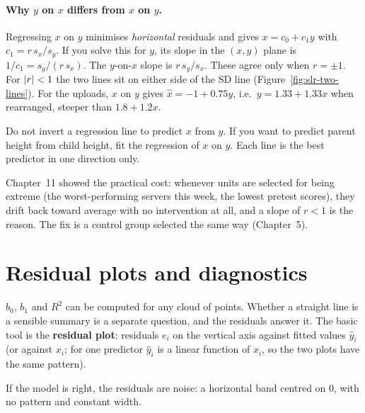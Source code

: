 \paragraph{Why $y$ on $x$ differs from $x$ on $y$.}
Regressing $x$ on $y$ minimises \emph{horizontal} residuals and gives
$x = c_0 + c_1 y$ with $c_1 = r\,s_x/s_y$. If you solve this for $y$, its slope
in the $(x,y)$ plane is $1/c_1 = s_y/(r\,s_x)$. The $y$-on-$x$ slope is
$r\,s_y/s_x$. These agree only when $r=\pm1$. For $\lvert r\rvert<1$ the two lines
sit on either side of the SD line (Figure~\ref{fig:slr-two-lines}). For the
uploads, $x$ on $y$ gives $\hat x = -1 + 0.75y$, i.e.\ $y = 1.33 + 1.33x$ when
rearranged, steeper than $1.8+1.2x$.

\begin{trapbox}
Do not invert a regression line to predict $x$ from $y$. If you want to predict
parent height from child height, fit the regression of $x$ on $y$. Each line is
the best predictor in one direction only.
\end{trapbox}

\begin{happeningbox}
Chapter~11 showed the practical cost: whenever units are selected for being
extreme (the worst-performing servers this week, the lowest pretest scores),
they drift back toward average with no intervention at all, and a slope of
$r<1$ is the reason. The fix is a control group selected the same way
(Chapter~5).
\end{happeningbox}

\section{Residual plots and diagnostics}
\label{sec:slr-diag}

$b_0$, $b_1$ and $R^2$ can be computed for any cloud of points. Whether a
straight line is a sensible summary is a separate question, and the residuals
answer it. The basic tool is the \textbf{residual plot}: residuals $e_i$ on the
vertical axis against fitted values $\hat y_i$ (or against $x_i$; for one
predictor $\hat y_i$ is a linear function of $x_i$, so the two plots have the
same pattern).

If the model is right, the residuals are noise: a horizontal band centred
on $0$, with no pattern and constant width.

